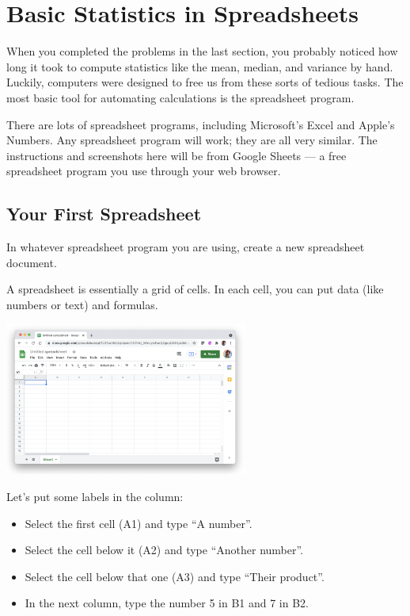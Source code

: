 \chapter{Basic Statistics in Spreadsheets}

When you completed the problems in the last section, you probably noticed
how long it took to compute statistics like the mean, median,
and variance by hand. Luckily, computers were designed to free us from these
sorts of tedious tasks. The most basic tool for automating
calculations is the spreadsheet program.

There are lots of spreadsheet programs, including Microsoft's Excel and
Apple's Numbers. Any spreadsheet program will work; they are all very
similar. The instructions and screenshots here will be from Google
Sheets --- a free spreadsheet program you use through your web browser.

\section{Your First Spreadsheet}

In whatever spreadsheet program you are using, create a new spreadsheet document.

A spreadsheet is essentially a grid of cells. In each cell, you can put data (like numbers or text) and formulas.

\includegraphics[width=0.6\textwidth]{BlankSheet.png}

Let's put some labels in the column:
\begin{itemize}
\item Select the first cell (A1) and type ``A number''.
\item Select the cell below it (A2) and type ``Another number''.
\item Select the cell below that one (A3) and type ``Their product''.
\item In the next column, type the number 5 in B1 and 7 in B2.
\end{itemize}

